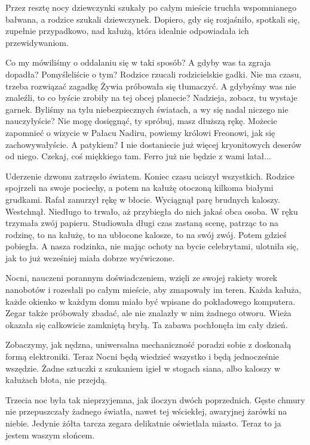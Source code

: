Przez resztę nocy dziewczynki szukały po całym mieście truchła wspomnianego bałwana, a rodzice szukali dziewczynek.
Dopiero, gdy się rozjaśniło, spotkali się, zupełnie przypadkowo, nad kałużą, która idealnie odpowiadała ich przewidywaniom.
\begin{dialogue}
	\ds{} Co my mówiliśmy o oddalaniu się w taki sposób?
	\ds{} A gdyby was ta zgraja dopadła? Pomyśleliście o tym? \dm{} Rodzice rzucali rodzicielskie gadki.
	\ds{} Nie ma czasu, trzeba rozwiązać zagadkę \dm{} Żywia próbowała się tłumaczyć.
	\ds{} A gdybyśmy was nie znaleźli, to co byście zrobiły na tej obcej planecie?
	\ds{} Nadzieja, zobacz, tu wystaje garnek.
	\ds{} Byliśmy na tylu niebezpiecznych światach, a wy się nadal niczego nie nauczyłyście?
	\ds{} Nie mogę dosięgnąć, ty spróbuj, masz dłuższą rękę.
	\ds{} Możecie zapomnieć o wizycie w Pałacu Nadiru, powiemy królowi Freonowi, jak się zachowywałyście.
	\ds{} A patykiem?
	\ds{} I nie dostaniecie już więcej kryonitowych deserów od niego.
	\ds{} Czekaj, coś miękkiego tam.
	\ds{} Ferro już nie będzie z wami latał...
\end{dialogue}

Uderzenie dzwonu zatrzęsło światem.
Koniec czasu uciszył wszystkich.
Rodzice spojrzeli na swoje pociechy, a potem na kałużę otoczoną kilkoma białymi grudkami.
Rafał zanurzył rękę w błocie.
Wyciągnął parę brudnych kaloszy.
Westchnął.
Niedługo to trwało, aż przybiegła do nich jakaś obca osoba. W ręku trzymała zwój papieru.
Studiowała długi czas zastaną scenę, patrząc to na rodzinę, to na kałużę, to na ubłocone kalosze, to na swój zwój.
Potem gdzieś pobiegła.
A nasza rodzinka, nie mając ochoty na bycie celebrytami, ulotniła się, jak to już wcześniej miała dobrze wyćwiczone.

Nocni, nauczeni porannym doświadczeniem, wzięli ze swojej rakiety worek nanobotów i rozesłali po całym mieście, aby zmapowały im teren. 
Każda kałuża, każde okienko w każdym domu miało być wpisane do pokładowego komputera.
Zegar także próbowały zbadać, ale nie znalazły w nim żadnego otworu. 
Wieża okazała się całkowicie zamkniętą bryłą.
Ta zabawa pochłonęła im cały dzień.

Zobaczymy, jak nędzna, uniwersalna mechaniczność poradzi sobie z doskonałą formą elektroniki.
Teraz Nocni będą wiedzieć wszystko i będą jednocześnie wszędzie.
Żadne sztuczki z szukaniem igieł w stogach siana, albo kaloszy w kałużach błota, nie przejdą.

Trzecia noc była tak nieprzyjemna, jak iloczyn dwóch poprzednich.
Gęste chmury nie przepuszczały żadnego światła, nawet tej wściekłej, awaryjnej żarówki na niebie.
Jedynie żółta tarcza zegara delikatnie oświetlała miasto.
Teraz to ja jestem waszym słońcem.

